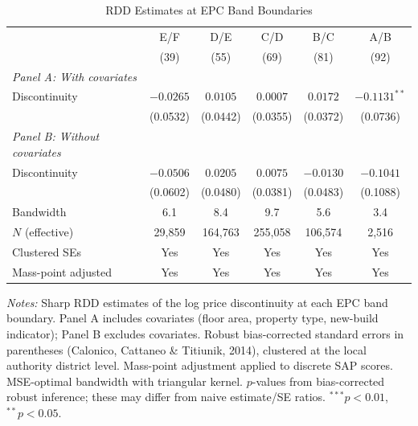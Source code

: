 \begin{table}[htbp]
\centering
\caption{RDD Estimates at EPC Band Boundaries}
\label{tab:main_rdd}
\begin{tabular}{lccccc}
\toprule
 & E/F & D/E & C/D & B/C & A/B \\
 & (39) & (55) & (69) & (81) & (92) \\
\midrule
\textit{Panel A: With covariates} & & & & & \\
\quad Discontinuity & $-0.0265$ & $0.0105$ & $0.0007$ & $0.0172$ & $-0.1131^{**}$ \\
 & (0.0532) & (0.0442) & (0.0355) & (0.0372) & (0.0736) \\
\addlinespace
\textit{Panel B: Without covariates} & & & & & \\
\quad Discontinuity & $-0.0506$ & $0.0205$ & $0.0075$ & $-0.0130$ & $-0.1041$ \\
 & (0.0602) & (0.0480) & (0.0381) & (0.0483) & (0.1088) \\
\midrule
Bandwidth & 6.1 & 8.4 & 9.7 & 5.6 & 3.4 \\
$N$ (effective) & 29,859 & 164,763 & 255,058 & 106,574 & 2,516 \\
Clustered SEs & Yes & Yes & Yes & Yes & Yes \\
Mass-point adjusted & Yes & Yes & Yes & Yes & Yes \\
\bottomrule
\end{tabular}
\begin{minipage}{\textwidth}
\footnotesize
\textit{Notes:} Sharp RDD estimates of the log price discontinuity at each EPC band boundary.
Panel A includes covariates (floor area, property type, new-build indicator); Panel B excludes covariates.
Robust bias-corrected standard errors in parentheses (Calonico, Cattaneo \& Titiunik, 2014),
clustered at the local authority district level. Mass-point adjustment applied to discrete SAP scores.
MSE-optimal bandwidth with triangular kernel. $p$-values from bias-corrected robust inference;
these may differ from naive estimate/SE ratios.
$^{***}p<0.01$, $^{**}p<0.05$.
\end{minipage}
\end{table}
